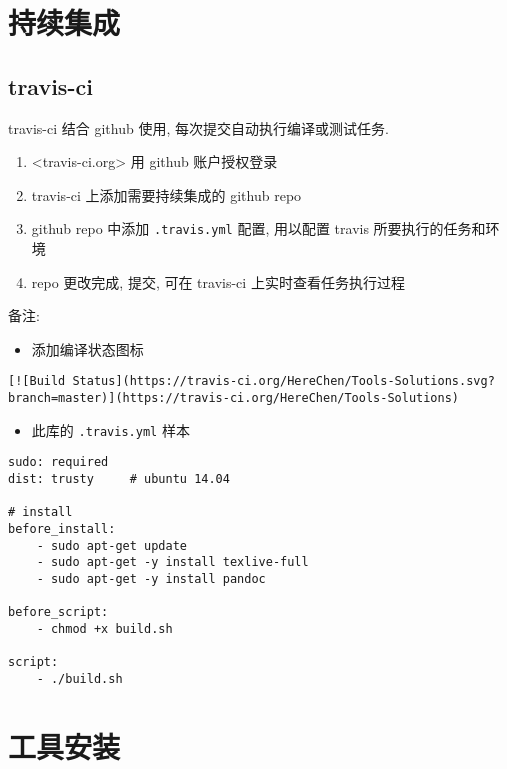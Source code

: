 \section{持续集成}\label{ux6301ux7eedux96c6ux6210}

\subsection{travis-ci}\label{travis-ci}

travis-ci 结合 github 使用, 每次提交自动执行编译或测试任务.

\begin{enumerate}
\def\labelenumi{\arabic{enumi}.}
\tightlist
\item
  \textless{}travis-ci.org\textgreater{} 用 github 账户授权登录
\item
  travis-ci 上添加需要持续集成的 github repo
\item
  github repo 中添加 \texttt{.travis.yml} 配置, 用以配置 travis
  所要执行的任务和环境
\item
  repo 更改完成, 提交, 可在 travis-ci 上实时查看任务执行过程
\end{enumerate}

备注:

\begin{itemize}
\tightlist
\item
  添加编译状态图标
\end{itemize}

\begin{verbatim}
[![Build Status](https://travis-ci.org/HereChen/Tools-Solutions.svg?branch=master)](https://travis-ci.org/HereChen/Tools-Solutions)
\end{verbatim}

\begin{itemize}
\tightlist
\item
  此库的 \texttt{.travis.yml} 样本
\end{itemize}

\begin{verbatim}
sudo: required
dist: trusty     # ubuntu 14.04

# install
before_install:
    - sudo apt-get update
    - sudo apt-get -y install texlive-full
    - sudo apt-get -y install pandoc

before_script:
    - chmod +x build.sh

script:
    - ./build.sh
\end{verbatim}

\section{工具安装}\label{ux5de5ux5177ux5b89ux88c5}

